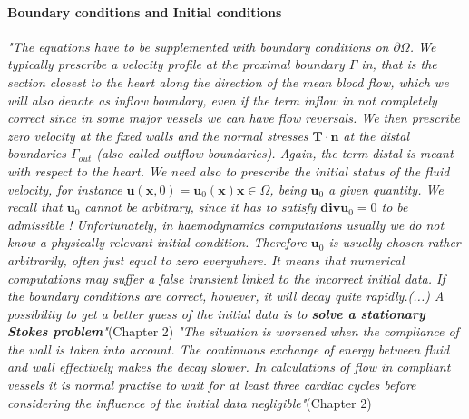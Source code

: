 \documentclass[11pt,letterpaper]{article}
\begin{document}
\paragraph{Boundary conditions and Initial conditions} \textit{"The equations have to be supplemented with boundary conditions on $\partial  \Omega$.
We typically prescribe a velocity profile at the proximal boundary $\Gamma$ in, that is the section closest to the heart along the direction of the mean blood flow, which we will also denote as inflow boundary, even if the term inflow in not completely correct since in some major vessels we can have flow reversals. We then prescribe zero velocity at the fixed walls and the normal stresses $\bm{T} \cdot \bm{n}$ at the distal boundaries $\Gamma_{out}$  (also called outflow boundaries). Again, the term distal is meant with respect to the heart.\newline\newline
We need also to prescribe the initial status of the fluid velocity, for instance
$\bm{u}(\bm{x}, 0) = \bm{u}_0(\bm{x}) \bm{x} \in \Omega$,
being $\bm{u}_0$ a given quantity. We recall that $\bm{u}_0$  cannot be arbitrary, since it has to satisfy $\bm{div}\bm{u}_0  = 0$ to be admissible
! Unfortunately, in haemodynamics computations usually we do not know a
physically relevant initial condition. Therefore  $\bm{u}_0$ is usually chosen rather arbitrarily, often just equal to zero everywhere. It means that numerical computations may suffer a false transient linked to the incorrect initial data. If the boundary conditions are correct, however, it will decay quite rapidly.(...) A possibility to get a better guess of the initial data is to \textbf{solve a stationary Stokes problem}"}(Chapter 2) \newline\newline
\textit{"The situation is worsened when the compliance of the wall is taken into
account. The continuous exchange of energy between fluid and wall effectively makes the decay slower. In calculations of flow in compliant vessels it is normal practise to wait for at least three cardiac cycles before considering the influence of the initial data negligible"}(Chapter 2)
\end{document}
